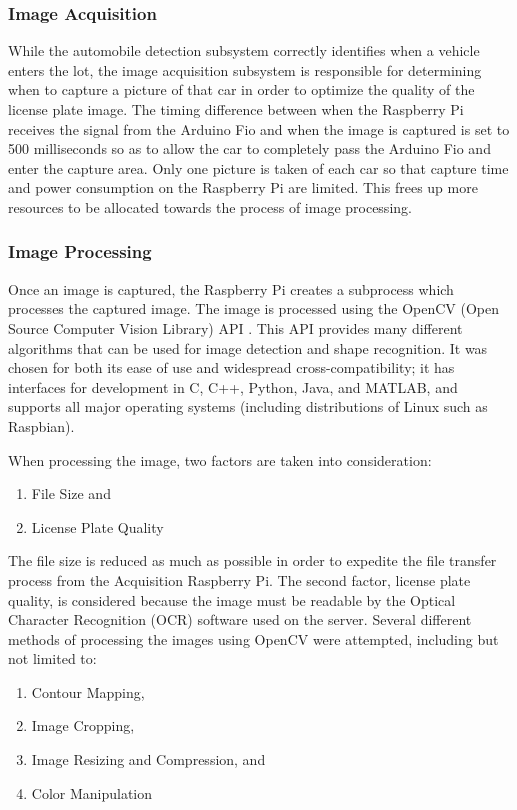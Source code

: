 \documentclass[11pt, oneside, fullpage, doublespace]{article}
\begin{document}
\subsubsection{Image Acquisition}
While the automobile detection subsystem correctly identifies when a vehicle enters the lot, the image acquisition subsystem is responsible for determining when to capture a picture of that car in order to optimize the quality of the license plate image. The timing difference between when the Raspberry Pi receives the signal from the Arduino Fio and when the image is captured is set to 500 milliseconds so as to allow the car to completely pass the Arduino Fio and enter the capture area. Only one picture is taken of each car so that capture time and power consumption on the Raspberry Pi are limited. This frees up more resources to be allocated towards the process of image processing.

\subsubsection{Image Processing}
Once an image is captured, the Raspberry Pi creates a subprocess which processes the captured image. The image is processed using the OpenCV (Open Source Computer Vision Library) API \cite{openCV}. This API provides many different algorithms that can be used for image detection and shape recognition. It was chosen for both its ease of use and widespread cross-compatibility; it has interfaces for development in C, C++, Python, Java, and MATLAB, and supports all major operating systems (including distributions of Linux such as Raspbian). 

When processing the image, two factors are taken into consideration:
\begin{enumerate}
\item File Size and
\item License Plate Quality
\end{enumerate}
The file size is reduced as much as possible in order to expedite the file transfer process from the Acquisition Raspberry Pi. The second factor, license plate quality, is considered because the image must be readable by the Optical Character Recognition (OCR) software used on the server. Several different methods of processing the images using OpenCV were attempted, including but not limited to:
\begin{enumerate}
\item Contour Mapping,
\item Image Cropping,
\item Image Resizing and Compression, and
\item Color Manipulation
\end{enumerate}
\end{document}

